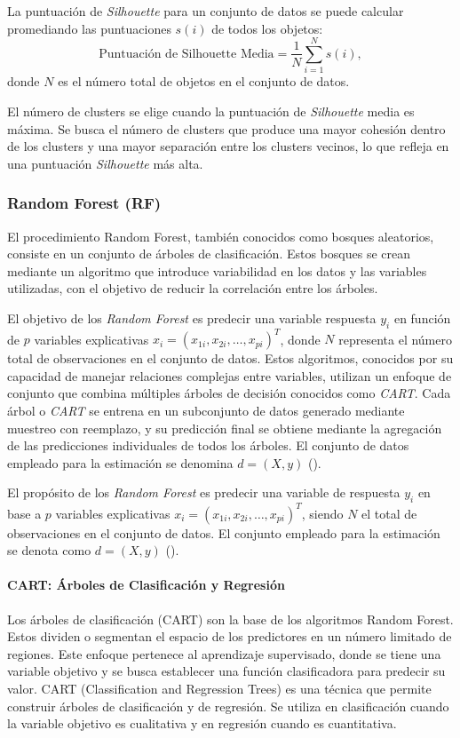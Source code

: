 {La puntuación de \textit{Silhouette} para un conjunto de datos se puede calcular promediando las puntuaciones $s(i)$ de todos los objetos:
\[ \text{Puntuación de Silhouette Media} = \frac{1}{N} \sum_{i=1}^{N} s(i), \]
donde \(N\) es el número total de objetos en el conjunto de datos.

El número de clusters se elige cuando la puntuación de \textit{Silhouette} media es máxima. Se busca el número de clusters que produce una mayor cohesión dentro de los clusters y una mayor
separación entre los clusters vecinos, lo que refleja en una puntuación \textit{Silhouette} más alta.


\subsubsection{Random Forest (RF)}\label{sec:rf}

El procedimiento Random Forest, también conocidos como bosques aleatorios, consiste en un conjunto de árboles de clasificación. Estos bosques se crean mediante un algoritmo que introduce variabilidad en los datos y las variables utilizadas, con el objetivo de reducir la correlación entre los árboles.


El objetivo de los \textit{Random Forest} es predecir una variable respuesta \(y_i\) en función de \(p\) variables explicativas \(x_i = (x_{1i}, x_{2i}, \ldots, x_{pi})^T\), donde \(N\) representa el número total de observaciones en el conjunto de datos. Estos algoritmos, conocidos por su capacidad de manejar relaciones complejas entre variables, utilizan un enfoque de conjunto que combina múltiples árboles de decisión conocidos como \textit{CART}. Cada árbol o \textit{CART} se entrena en un subconjunto de datos generado mediante muestreo con reemplazo, y su predicción final se obtiene mediante la agregación de las predicciones individuales de todos los árboles. El conjunto de datos empleado para la estimación se denomina \(d = (X, y)\) (\cite{ho1995random}).


El propósito de los \textit{Random Forest} es predecir una variable de respuesta \(y_i\) en base a \(p\) variables explicativas \(x_i = (x_{1i}, x_{2i}, \ldots, x_{pi})^T\), siendo \(N\) el total de observaciones en el conjunto de datos. El conjunto empleado para la estimación se denota como \(d = (X, y)\) (\cite{ho1995random}).



\paragraph{CART: Árboles de Clasificación y Regresión}
Los árboles de clasificación (CART) son la base de los algoritmos Random Forest. Estos dividen o segmentan el espacio de los predictores en un número limitado de regiones. Este enfoque pertenece al aprendizaje supervisado, donde se tiene una variable objetivo y se busca establecer una función clasificadora para predecir su valor. CART (Classification and Regression Trees) es una técnica que permite construir árboles de clasificación y de regresión. Se utiliza en clasificación cuando la variable objetivo es cualitativa y en regresión cuando es cuantitativa.

}
